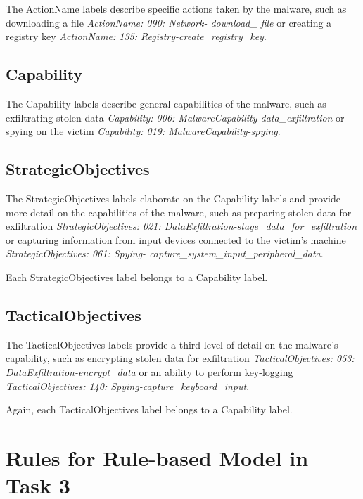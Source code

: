 \documentclass[11pt,a4paper]{article}
\begin{document}
The ActionName labels describe specific actions taken by the malware, such as downloading a file \emph{ActionName: 090: Network- download\_ file} or creating a registry key \emph{ActionName: 135: Registry-create\_registry\_key}.

\subsection{Capability}

The Capability labels describe general capabilities of the malware, such as exfiltrating stolen data \emph{Capability: 006: MalwareCapability-data\_exfiltration} or spying on the victim \emph{Capability: 019: MalwareCapability-spying}.


\subsection{StrategicObjectives}

The StrategicObjectives labels elaborate on the Capability labels and provide more detail on the capabilities of the malware, such as preparing stolen data for exfiltration \emph{StrategicObjectives: 021: DataExfiltration-stage\_data\_for\_exfiltration} or capturing information from input devices connected to the victim's machine \emph{StrategicObjectives: 061: Spying- capture\_system\_input\_peripheral\_data}. 

Each StrategicObjectives label belongs to a Capability label.

\subsection{TacticalObjectives}

The TacticalObjectives labels provide a third level of detail on the malware's capability, such as encrypting stolen data for exfiltration \emph{TacticalObjectives: 053: DataExfiltration-encrypt\_data} or an ability to perform key-logging \emph{TacticalObjectives: 140: Spying-capture\_keyboard\_input}. 

Again, each TacticalObjectives label belongs to a Capability label.

\section{Rules for Rule-based Model in Task 3}
\end{document}
